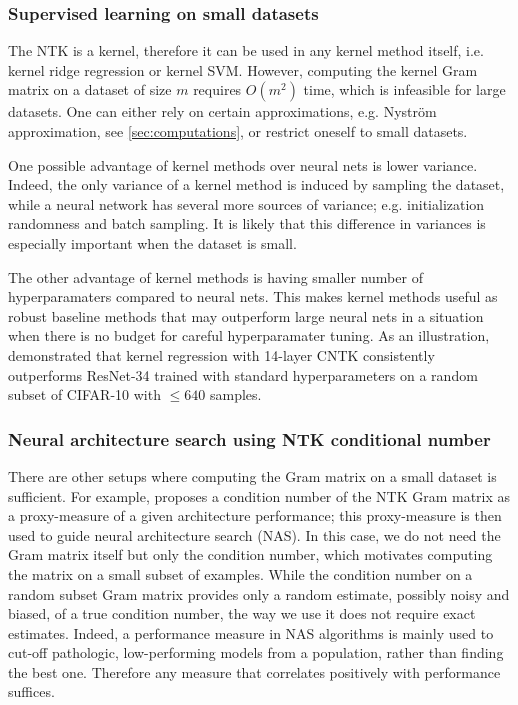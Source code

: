\documentclass{article}
\begin{document}
    \subsubsection{Supervised learning on small datasets}

    The NTK is a kernel, therefore it can be used in any kernel method itself, i.e. kernel ridge regression or kernel SVM.
    However, computing the kernel Gram matrix on a dataset of size $m$ requires $O(m^2)$ time, which is infeasible for large datasets.
    One can either rely on certain approximations, e.g. Nystr\"om approximation, see \cref{sec:computations}, or restrict oneself to small datasets.

    One possible advantage of kernel methods over neural nets is lower variance.
    Indeed, the only variance of a kernel method is induced by sampling the dataset, while a neural network has several more sources of variance; e.g. initialization randomness and batch sampling.
    It is likely that this difference in variances is especially important when the dataset is small.

    The other advantage of kernel methods is having smaller number of hyperparamaters compared to neural nets.
    This makes kernel methods useful as robust baseline methods that may outperform large neural nets in a situation when there is no budget for careful hyperparamater tuning.
    As an illustration, \cite{arora2019harnessing} demonstrated that kernel regression with 14-layer CNTK consistently outperforms ResNet-34 trained with standard hyperparameters on a random subset of CIFAR-10 with $\leq 640$ samples.


    \subsubsection{Neural architecture search using NTK conditional number}

    There are other setups where computing the Gram matrix on a small dataset is sufficient.
    For example, \cite{chen2021neural} proposes a condition number of the NTK Gram matrix as a proxy-measure of a given architecture performance; this proxy-measure is then used to guide neural architecture search (NAS).
    In this case, we do not need the Gram matrix itself but only the condition number, which motivates computing the matrix on a small subset of examples.
    While the condition number on a random subset Gram matrix provides only a random estimate, possibly noisy and biased, of a true condition number, the way we use it does not require exact estimates.
    Indeed, a performance measure in NAS algorithms is mainly used to cut-off pathologic, low-performing models from a population, rather than finding the best one.
    Therefore any measure that correlates positively with performance suffices.
\end{document}
